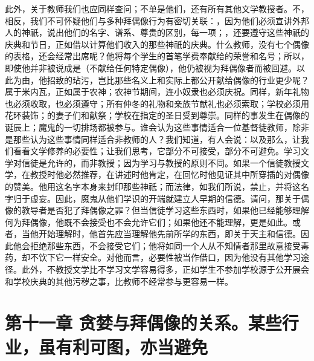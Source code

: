 此外，关于教师我们也应同样查问；不单是他们，还有所有其他文学教授者。不，相反，我们不可怀疑他们与多种拜偶像行为有密切关联：，因为他们必须宣讲外邦人的神祇，说出他们的名字、谱系、尊贵的区别，每一项；，还要遵守这些神祇的庆典和节日，正如借以计算他们收入的那些神祇的庆典。什么教师，没有七个偶像的表格，还会经常出席呢？他将每个学生的首笔学费奉献给的荣誉和名号；所以，即使他并非被说成是（不献给任何特定偶像），他仍被视为拜偶像者而被回避。以此为由，他招致的玷污，岂比那些名义上和实际上都公开献给偶像的行业更少呢？属于米内瓦，正如属于农神；农神节期间，连小奴隶也必须庆祝。同样，新年礼物也必须收取，也必须遵守；所有仲冬的礼物和亲族节献礼也必须索取；学校必须用花环装饰；的妻子们和献祭；学校在指定的圣日受到尊崇。同样的事发生在偶像的诞辰上；魔鬼的一切排场都被参与。谁会认为这些事情适合一位基督徒教师，除非是那些认为这些事情同样适合非教师的人？我们知道，有人会说：以及那么，让我们看看文学修养的必要性；让我们思考，它部分不可接受，部分不可避免。学习文学对信徒是允许的，而非教授；因为学习与教授的原则不同。如果一个信徒教授文学，在教授时他必然推荐，在讲述时他肯定，在回忆时他见证其中所穿插的对偶像的赞美。他用这名字本身来封印那些神祇；而法律，如我们所说，禁止，并将这名字归于虚妄。因此，魔鬼从他们学识的开端就建立人早期的信德。请问，那关于偶像的教导者是否犯了拜偶像之罪？但当信徒学习这些东西时，如果他已经能够理解何为拜偶像，他既不会接受也不会允许它们；如果他还不能理解，更是如此。或者，当他开始理解时，他首先应当理解他先前所学的东西，即关于天主和信德。因此他会拒绝那些东西，不会接受它们；他将如同一个人从不知情者那里故意接受毒药，却不饮下它一样安全。对他而言，必要性被当作借口，因为他没有其他学习途径。此外，不教授文学比不学习文学容易得多，正如学生不参加学校源于公开展会和学校庆典的其他污秽之事，比教师不经常参与更容易一样。\par


\section{第十一章  贪婪与拜偶像的关系。某些行业，虽有利可图，亦当避免}

